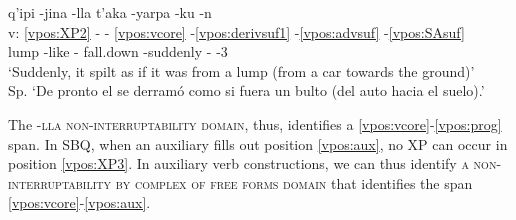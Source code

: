 \documentclass[output=paper]{langscibook}
\begin{document}
\ea \label{ex:llaV}{
    \glll {} q'ipi -jina -lla t'aka -yarpa -ku -n \\
    v: \ref{vpos:XP2} - - \ref{vpos:vcore} -\ref{vpos:derivsuf1} -\ref{vpos:advsuf} -\ref{vpos:SAsuf} \\
    {} lump -like -\Limit{} fall.down -suddenly -\Refl{} -3\Sg{} \\
    \glt `Suddenly, it spilt as if it was from a lump (from a car towards the ground)' \\ Sp. `De pronto el se derramó como si fuera un bulto (del auto hacia el suelo).' }
\z 

The \textsc{-lla non-interruptability domain}, thus, identifies a \ref{vpos:vcore}-\ref{vpos:prog} span. In SBQ, when an auxiliary fills out position \ref{vpos:aux}, no XP can occur in position \ref{vpos:XP3}. In auxiliary verb constructions, we can thus identify \textsc{a non-interruptability by complex of free forms domain} that identifies the span \ref{vpos:vcore}-\ref{vpos:aux}. 


\end{document}
